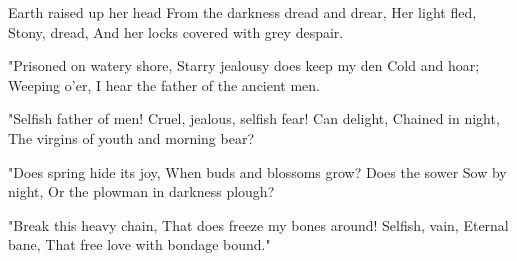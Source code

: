 
\begin{poem}

\begin{stanza}
Earth raised up her head
From the darkness dread and drear,
Her light fled,
Stony, dread,
And her locks covered with grey despair.
\end{stanza}
\begin{stanza}
"Prisoned on watery shore,
Starry jealousy does keep my den
Cold and hoar;
Weeping o'er,
I hear the father of the ancient men.
\end{stanza}
\begin{stanza}
"Selfish father of men!
Cruel, jealous, selfish fear!
Can delight,
Chained in night,
The virgins of youth and morning bear?
\end{stanza}
\begin{stanza}
"Does spring hide its joy,
When buds and blossoms grow?
Does the sower
Sow by night,
Or the plowman in darkness plough?
\end{stanza}
\begin{stanza}
"Break this heavy chain,
That does freeze my bones around!
Selfish, vain,
Eternal bane,
That free love with bondage bound."
\end{stanza}

\end{poem}
